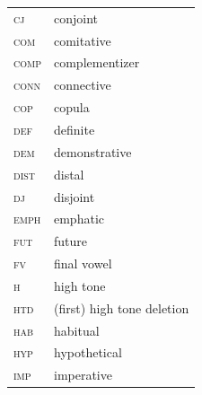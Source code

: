 \documentclass[output=paper,colorlinks=true, citecolor=brown,draftmode]{langscibook}
\begin{document}
\begin{tabularx}{.45\textwidth}{lQ}
\scshape cj & conjoint \\
\scshape com & comitative \\
\scshape comp & complementizer \\
\scshape conn & connective \\
\scshape cop & copula \\
\scshape def & definite\\
\scshape dem & demonstrative \\ 
\scshape dist & distal  \\ 
\scshape dj & disjoint \\
\scshape emph & emphatic \\
\scshape fut & future \\
\scshape fv & final vowel \\
\scshape h & high tone \\
\scshape htd & (first) high tone deletion \\
\scshape hab & habitual \\
\scshape hyp & hypothetical \\
\scshape imp & imperative \\
\end{tabularx}
\end{document}

